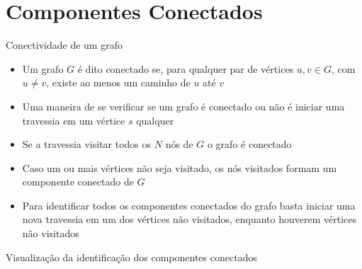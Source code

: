 \section{Componentes Conectados}

\begin{frame}[fragile]{Conectividade de um grafo}

    \begin{itemize}
        \item Um grafo $G$ é dito conectado se, para qualquer par de vértices $u, v\in G$, com
            $u\neq v$, existe ao menos um caminho de $u$ até $v$

        \item Uma maneira de se verificar se um grafo é conectado ou não é iniciar uma travessia
            em um vértice $s$ qualquer

        \item Se a travessia visitar todos os $N$ nós de $G$ o grafo é conectado

        \item Caso um ou mais vértices não seja visitado, os nós visitados formam um 
            componente conectado de $G$

        \item Para identificar todos os componentes conectados do grafo basta iniciar uma nova
            travessia em um dos vértices não visitados, enquanto houverem vértices não
            visitados
    \end{itemize}

\end{frame}

\begin{frame}[fragile]{Visualização da identificação dos componentes conectados}


\end{frame}

